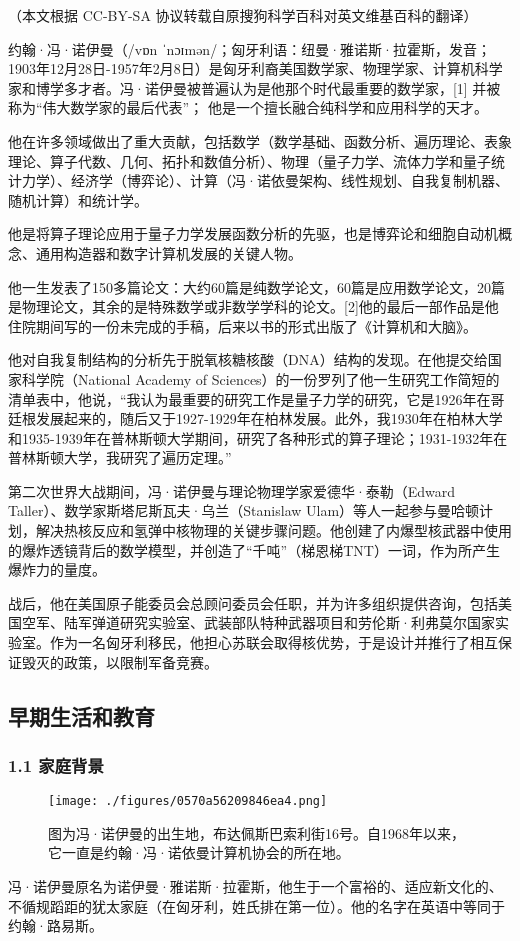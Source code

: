 
（本文根据 CC-BY-SA 协议转载自原搜狗科学百科对英文维基百科的翻译）

约翰·冯·诺伊曼（/vɒn ˈnɔɪmən/；匈牙利语：纽曼·雅诺斯·拉霍斯，发音；1903年12月28日-1957年2月8日）是匈牙利裔美国数学家、物理学家、计算机科学家和博学多才者。冯·诺伊曼被普遍认为是他那个时代最重要的数学家，[1] 并被称为“伟大数学家的最后代表”； 他是一个擅长融合纯科学和应用科学的天才。

他在许多领域做出了重大贡献，包括数学（数学基础、函数分析、遍历理论、表象理论、算子代数、几何、拓扑和数值分析）、物理（量子力学、流体力学和量子统计力学）、经济学（博弈论）、计算（冯·诺依曼架构、线性规划、自我复制机器、随机计算）和统计学。

他是将算子理论应用于量子力学发展函数分析的先驱，也是博弈论和细胞自动机概念、通用构造器和数字计算机发展的关键人物。

他一生发表了150多篇论文：大约60篇是纯数学论文，60篇是应用数学论文，20篇是物理论文，其余的是特殊数学或非数学学科的论文。[2]他的最后一部作品是他住院期间写的一份未完成的手稿，后来以书的形式出版了《计算机和大脑》。

他对自我复制结构的分析先于脱氧核糖核酸（DNA）结构的发现。在他提交给国家科学院（National Academy of Sciences）的一份罗列了他一生研究工作简短的清单表中，他说，“我认为最重要的研究工作是量子力学的研究，它是1926年在哥廷根发展起来的，随后又于1927-1929年在柏林发展。此外，我1930年在柏林大学和1935-1939年在普林斯顿大学期间，研究了各种形式的算子理论；1931-1932年在普林斯顿大学，我研究了遍历定理。”

第二次世界大战期间，冯·诺伊曼与理论物理学家爱德华·泰勒（Edward Taller）、数学家斯塔尼斯瓦夫·乌兰（Stanislaw Ulam）等人一起参与曼哈顿计划，解决热核反应和氢弹中核物理的关键步骤问题。他创建了内爆型核武器中使用的爆炸透镜背后的数学模型，并创造了“千吨”（梯恩梯TNT）一词，作为所产生爆炸力的量度。

战后，他在美国原子能委员会总顾问委员会任职，并为许多组织提供咨询，包括美国空军、陆军弹道研究实验室、武装部队特种武器项目和劳伦斯·利弗莫尔国家实验室。作为一名匈牙利移民，他担心苏联会取得核优势，于是设计并推行了相互保证毁灭的政策，以限制军备竞赛。

\subsection{早期生活和教育}
\subsubsection{1.1 家庭背景}
\begin{figure}[ht]
\centering
\texttt{[image: ./figures/0570a56209846ea4.png]}
\caption{图为冯·诺伊曼的出生地，布达佩斯巴索利街16号。自1968年以来，它一直是约翰·冯·诺依曼计算机协会的所在地。} \label{fig_von_1}
\end{figure}
冯·诺伊曼原名为诺伊曼·雅诺斯·拉霍斯，他生于一个富裕的、适应新文化的、不循规蹈距的犹太家庭（在匈牙利，姓氏排在第一位）。他的名字在英语中等同于约翰·路易斯。

